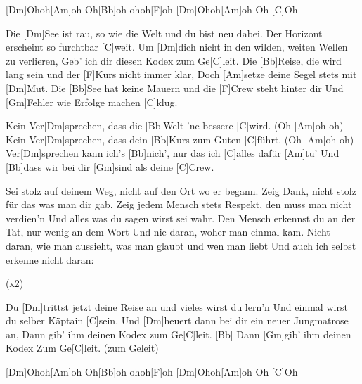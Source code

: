 

\begin{guitar}
	[Dm]Ohoh[Am]oh Oh[Bb]oh ohoh[F]oh
	[Dm]Ohoh[Am]oh Oh [C]Oh
	
	Die [Dm]See ist rau, so wie die Welt und du bist neu dabei.
	Der Horizont erscheint so furchtbar [C]weit.
	Um [Dm]dich nicht in den wilden, weiten Wellen zu verlieren,
	Geb' ich dir diesen Kodex zum Ge[C]leit.
	Die [Bb]Reise, die wird lang sein und der [F]Kurs nicht immer klar,
	Doch [Am]setze deine Segel stets mit [Dm]Mut.
	Die [Bb]See hat keine Mauern und die [F]Crew steht hinter dir
	Und [Gm]Fehler wie Erfolge machen [C]klug.
	
	Kein Ver[Dm]sprechen, dass die [Bb]Welt 'ne bessere [C]wird. (Oh [Am]oh oh)
	Kein Ver[Dm]sprechen, dass dein [Bb]Kurs zum Guten [C]führt. (Oh [Am]oh oh)
	Ver[Dm]sprechen kann ich's [Bb]nich', nur das ich [C]alles dafür [Am]tu'
	Und [Bb]dass wir bei dir [Gm]sind als deine [C]Crew.
	
	 
	
	Sei stolz auf deinem Weg, nicht auf den Ort wo er begann.
	Zeig Dank, nicht stolz für das was man dir gab.
	Zeig jedem Mensch stets Respekt, den muss man nicht verdien'n
	Und alles was du sagen wirst sei wahr.
	Den Mensch erkennst du an der Tat, nur wenig an dem Wort
	Und nie daran, woher man einmal kam.
	Nicht daran, wie man aussieht, was man glaubt und wen man liebt
	Und auch ich selbst erkenne nicht daran:
	
	  (x2)
	
	Du [Dm]trittst jetzt deine Reise an und vieles wirst du lern'n
	Und einmal wirst du selber Käptain [C]sein.
	Und [Dm]heuert dann bei dir ein neuer Jungmatrose an,
	Dann gib' ihm deinen Kodex zum Ge[C]leit.
	[Bb] Dann [Gm]gib' ihm deinen Kodex 
	Zum Ge[C]leit. (zum Geleit)
	
	 
	
	[Dm]Ohoh[Am]oh Oh[Bb]oh ohoh[F]oh
	[Dm]Ohoh[Am]oh Oh [C]Oh
\end{guitar}